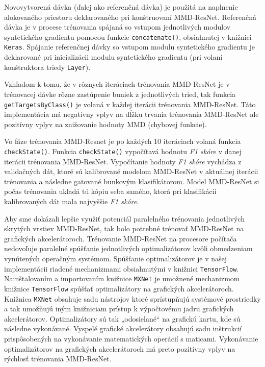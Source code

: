 Novovytvorená dávka (ďalej ako referenčná dávka) je použitá na naplnenie alokovaného priestoru deklarovaného pri konštruovaní MMD-ResNet. Referenčná dávka je v procese trénovania spájaná so vstupom jednotlivých modulov syntetického gradientu pomocou funkcie \texttt{concatenate()}, obsiahnutej v knižnici \texttt{Keras}. Spájanie referenčnej dávky so vstupom modulu syntetického gradientu je deklarované pri inicializácii modulu syntetického gradientu (pri volaní konštruktora triedy \texttt{Layer}). 

Vzhľadom k tomu, že v rôznych iteráciach trénovania MMD-ResNet je v trénovacej dávke rôzne zastúpenie buniek z jednotlivých tried, tak funkcia \texttt{getTargetsByClass()} je volaná v každej iterácii trénovania MMD-ResNet. Táto implementácia má negatívny vplyv na dĺžku trvania trénovania MMD-ResNet ale pozitívny vplyv na znižovanie hodnoty MMD (chybovej funkcie).

\begin{sloppypar}
Vo fáze trénovania MMD-Resnet je po každých 10 iteráciach volaná funkcia \texttt{checkState()}. Funkcia \texttt{checkState()} vypočítavá hodnotu \textit{F1 skóre} v danej iterácii trénovania MMD-ResNet. Vypočítanie hodnoty \textit{F1 skóre} vychádza z validačných dát, ktoré sú kalibrované modelom MMD-ResNet v aktuálnej iterácii trénovania a následne gatované bunkovým klasifikátorom. Model MMD-ResNet si počas trénovania ukladá tú kópiu seba samého, ktorá pri klasifikácii kalibrovaných dát mala najvyššie \textit{F1 skóre}.
\end{sloppypar}

Aby sme dokázali lepšie využiť potenciál paralelného trénovania jednotlivých skrytých vrstiev MMD-ResNet, tak bolo potrebné trénovať MMD-ResNet na grafických akcelerátoroch. Trénovanie MMD-ResNet na procesore počítača nedovoľuje paralelné spúšťanie jednotlivých optimalizátorov kvôli obmedzeniam vynútených operačným systémom. Spúšťanie optimalizátorov je v našej implementácii riadené mechanizmami obsiahnutými v knižnici \texttt{TensorFlow}. Nainštalovaním a importovaním knižnice \texttt{MXNet} je umožnené mechanizmom knižnice \texttt{TensorFlow} spúšťať optimalizátory na grafických akcelerátoroch. Knižnica \texttt{MXNet} obsahuje sadu nástrojov ktoré sprístupňujú systémové prostriedky a tak umožňujú iným knižniciam prístup k výpočtovému jadru grafických akcelerátorov. Optimalizátory sú tak „odosielané“ na grafickú kartu, kde sú následne vykonávané. Vyspelé grafické akcelerátory obsahujú sadu inštrukcií prispôsobených na vykonávanie matematických operácií s maticami. Vykonávanie optimalizátorov na grafických akcelerátoroch má preto pozitívny vplyv na rýchlosť trénovania MMD-ResNet.

